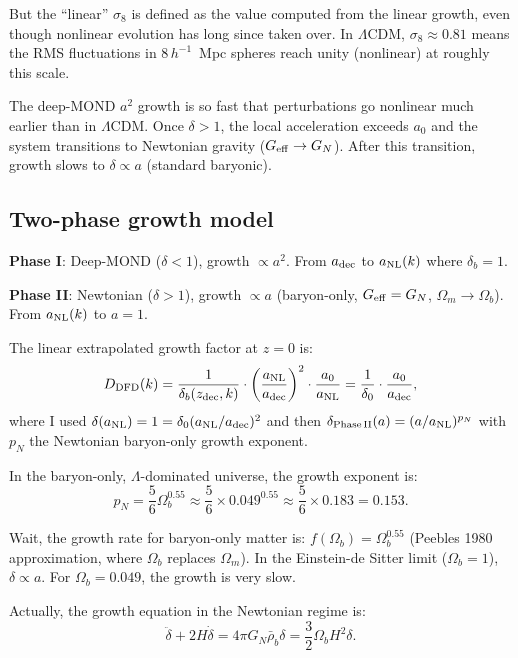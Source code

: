 \documentclass[11pt]{article}
\newcommand{\LCDM}{$\Lambda$CDM}
\newcommand{\Geff}{G_{\rm eff}}
\newcommand{\aM}{a_0}
\newcommand{\rhob}{\bar{\rho}_b}
\newcommand{\Ob}{\Omega_b}
\newcommand{\Om}{\Omega_m}
\begin{document}
But the ``linear'' $\sigma_8$ is defined as the value computed from
the linear growth, even though nonlinear evolution has long since
taken over. In \LCDM, $\sigma_8 \approx 0.81$ means the RMS
fluctuations in $8\,h^{-1}$~Mpc spheres reach unity (nonlinear)
at roughly this scale.

The deep-MOND $a^2$ growth is so fast that perturbations go nonlinear
much earlier than in \LCDM. Once $\delta > 1$, the local acceleration
exceeds $\aM$ and the system transitions to Newtonian gravity
($\Geff \to G_N$). After this transition, growth slows to
$\delta \propto a$ (standard baryonic).

\subsection{Two-phase growth model}

\textbf{Phase I}: Deep-MOND ($\delta < 1$), growth $\propto a^2$.
From $a_{\rm dec}$ to $a_{\rm NL}(k)$ where $\delta_b = 1$.

\textbf{Phase II}: Newtonian ($\delta > 1$), growth $\propto a$
(baryon-only, $\Geff = G_N$, $\Om \to \Ob$).
From $a_{\rm NL}(k)$ to $a = 1$.

The linear extrapolated growth factor at $z = 0$ is:
\begin{equation}
D_{\rm DFD}(k) = \frac{1}{\delta_b(z_{\rm dec}, k)}\cdot
\left(\frac{a_{\rm NL}}{a_{\rm dec}}\right)^2\cdot
\frac{a_0}{a_{\rm NL}}
= \frac{1}{\delta_0}\cdot\frac{a_0}{a_{\rm dec}},
\end{equation}
where I used $\delta(a_{\rm NL}) = 1 = \delta_0(a_{\rm NL}/a_{\rm dec})^2$
and then $\delta_{\rm Phase\,II}(a) = (a/a_{\rm NL})^{p_N}$ with
$p_N$ the Newtonian baryon-only growth exponent.

In the baryon-only, $\Lambda$-dominated universe, the growth exponent is:
\begin{equation}
p_N = \frac{5}{6}\Ob^{0.55} \approx \frac{5}{6}\times 0.049^{0.55}
\approx \frac{5}{6}\times 0.183 = 0.153.
\end{equation}

Wait, the growth rate for baryon-only matter is:
$f(\Ob) = \Ob^{0.55}$ (Peebles 1980 approximation, where
$\Ob$ replaces $\Om$). In the Einstein-de Sitter limit ($\Ob = 1$),
$\delta \propto a$. For $\Ob = 0.049$, the growth is very slow.

Actually, the growth equation in the Newtonian regime is:
\begin{equation}
\ddot\delta + 2H\dot\delta = 4\pi G_N\rhob\delta
= \frac{3}{2}\Ob H^2\delta.
\end{equation}
\end{document}

